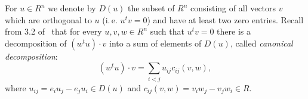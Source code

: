\documentclass[oneside, 10pt]{amsart}
\DeclareMathOperator{\St}{St}
\numberwithin{equation}{section}
\numberwithin{lemma}{section}
\theoremstyle{definition}
\theoremstyle{remark}
\begin{document}
For $u \in R^n$ we denote by $D(u)$ the subset of $R^n$ consisting of all vectors $v$ which are orthogonal to $u$ (i.\,e. $u^tv = 0$) and have at least two zero entries.
Recall from 3.2 of~\cite{Ka77} that for every $u, v, w \in R^n$ such that $u^t v = 0$ there
 is a decomposition of $(w^t u) \cdot v$ into a sum of elements of $D(u)$, called {\it canonical decomposition}:
\begin{equation} \label{eq:canonical} (w^tu) \cdot v=\sum_{i<j}u_{ij} c_{ij}(v, w),\end{equation}
where $u_{ij} =e_iu_j-e_ju_i \in D(u)$ and $c_{ij}(v, w) =v_iw_j-v_jw_i \in R$.

\begin{comment}
Let $u, v \in R^n$ be such that $u^t v = 0$ and assume, moreover, that either $u$ or $v$ has at least one zero entry.
Recall from 3.8, 3.10 of~\cite{Ka77} that under these assumptions one can define certain element
 $x(u, v)$ of $\St(n, R)$ such that $\phi(x(u, v)) = t(u, v) = 1 + uv^t$.
Let us recall the standard properties of $x(u, v)$ (cf.~\cite[Lemma~1.1]{Tu83}).

\begin{itemize}
 \item If $v$ or $w$ has at least two zero entries, then
  \begin{equation} \label{item:xsmall-scalar} x(v, wa) = x(va, w), \text{ for $a\in R$} \end{equation}
 \item If $w_1$ and $w_2$ have at least one common zero entry then
 \begin{equation} \label{item:xsmall-additivity} x(v, w_1) \cdot x(v, w_2) = x(v, w_1+w_2).\end{equation}
 \item If $v$, $v'$ are simultaneously orthogonal to $w$ and $w'$ and the elements $w, w'$ both have at least two zero entries then 
  \begin{equation} \label{item:xsmall-commute} [x(v, w),\ x(v', w')] = 1 \end{equation}
\end{itemize}

Now let $I$ be a splitting ideal of $R$.
Let $u \in E(n, R)e_1$, $v \in I^n$ be vectors such that $u^tv = 0$.
Recall from \S~4 of~\cite{LS17} that one can define the following elements of $\St(n, R, I) \leq \St(n, R)$:
\begin{equation} \label{eq:sigma-definition}
 F(u, v) = \prod\limits_{i=1}^r x(u,  v_i),\ \
 S(v, u) = \prod\limits_{i=1}^r x( v_i, u).
\end{equation}
Here $\{v_r\}$, $r=1,\ldots,N$ is any collection of elements of $I^n \cap D(u)$ such that $\sum_{r=1}^N v_r = v$.
Since $u$ is unimodular, such a collection always exists by~\eqref{eq:canonical}, moreover $F(u, v)$ and $S(u, v)$ do not depend on its choice. %
\end{comment}
\end{document}
